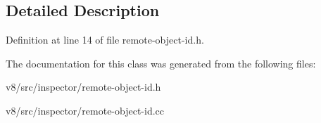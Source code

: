 \subsection{Detailed Description}


Definition at line 14 of file remote-\/object-\/id.\+h.



The documentation for this class was generated from the following files\+:\begin{DoxyCompactItemize}
\item 
v8/src/inspector/remote-\/object-\/id.\+h\item 
v8/src/inspector/remote-\/object-\/id.\+cc\end{DoxyCompactItemize}
